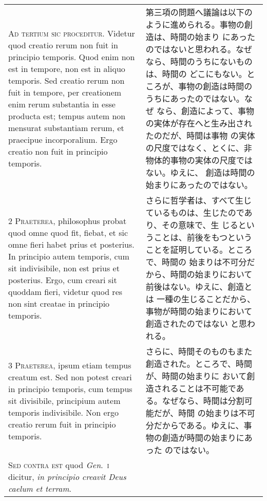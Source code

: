 \documentclass[10pt]{jsarticle} %
\begin{document}
\begin{longtable}{p{21em}p{21em}}

{\huge A}{\scshape d tertium sic proceditur}. Videtur quod
creatio rerum non fuit in principio temporis. Quod enim non est in
tempore, non est in aliquo temporis. Sed creatio rerum non fuit in
tempore, per creationem enim rerum substantia in esse producta est;
tempus autem non mensurat substantiam rerum, et praecipue
incorporalium. Ergo creatio non fuit in principio temporis.

&

第三項の問題へ議論は以下のように進められる。事物の創造は、時間の始まり
にあったのではないと思われる。なぜなら、時間のうちにないものは、時間の
どこにもない。ところが、事物の創造は時間のうちにあったのではない。なぜ
なら、創造によって、事物の実体が存在へと生み出されたのだが、時間は事物
の実体の尺度ではなく、とくに、非物体的事物の実体の尺度ではない。ゆえに、
創造は時間の始まりにあったのではない。

\\


{\scshape 2 Praeterea}, philosophus probat quod omne
quod fit, fiebat, et sic omne fieri habet prius et posterius. In
principio autem temporis, cum sit indivisibile, non est prius et
posterius. Ergo, cum creari sit quoddam fieri, videtur quod res non sint
creatae in principio temporis.


&

さらに哲学者は、すべて生じているものは、生じたのであり、その意味で、生
じるということは、前後をもつということを証明している。ところで、時間の
始まりは不可分だから、時間の始まりにおいて前後はない。ゆえに、創造とは
一種の生じることだから、事物が時間の始まりにおいて創造されたのではない
と思われる。
\\

{\scshape 3 Praeterea}, ipsum etiam tempus creatum
est. Sed non potest creari in principio temporis, cum tempus sit
divisibile, principium autem temporis indivisibile. Non ergo creatio
rerum fuit in principio temporis.

&

さらに、時間そのものもまた創造された。ところで、時間が、時間の始まりに
おいて創造されることは不可能である。なぜなら、時間は分割可能だが、時間
の始まりは不可分だからである。ゆえに、事物の創造が時間の始まりにあった
のではない。

\\


{\scshape Sed contra est} quod {\itshape Gen}.~{\scshape i} dicitur,
{\itshape in principio creavit Deus caelum et terram}.


\end{longtable}
\end{document}
